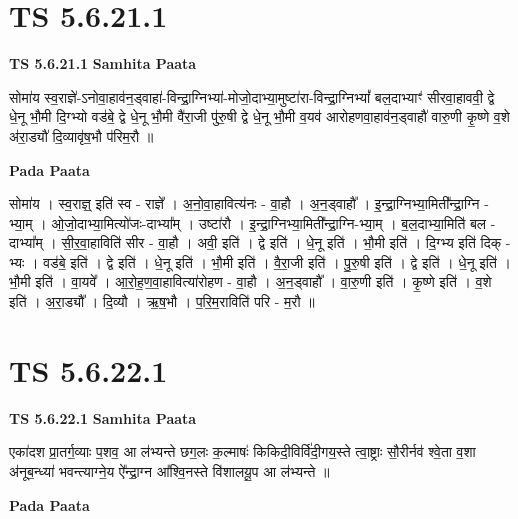 \documentclass[17pt]{extarticle}
\begin{document}

\section{ TS 5.6.21.1 }

\textbf{TS 5.6.21.1 } \newline
\textbf{Samhita Paata} \newline

सोमा॑य स्व॒राज्ञे॑-ऽनोवा॒हाव॑न॒ड्वाहा॑-विन्द्रा॒ग्निभ्या॑-मोजो॒दाभ्या॒मुष्टा॑रा-विन्द्रा॒ग्निभ्यां᳚ बल॒दाभ्याꣳ॑ सीरवा॒हाववी॒ द्वे धे॒नू भौ॒मी दि॒ग्भ्यो वड॑बे॒ द्वे धे॒नू भौ॒मी वै॑रा॒जी पु॑रु॒षी द्वे धे॒नू भौ॒मी व॒यव॑ आरोहणवा॒हाव॑न॒ड्वाहौ॑ वारु॒णी कृ॒ष्णे व॒शे अ॑रा॒ड्यौ॑ दि॒व्यावृ॑ष॒भौ प॑रिम॒रौ ॥ \newline

\textbf{Pada Paata} \newline

सोमा॑य । स्व॒राज्ञ्॒ इति॑ स्व - राज्ञे᳚ । अ॒नो॒वा॒हावित्य॑नः - वा॒हौ । अ॒न॒ड्वाहौ᳚ । इ॒न्द्रा॒ग्निभ्या॒मिती᳚न्द्रा॒ग्नि - भ्या॒म् । ओ॒जो॒दाभ्या॒मित्यो॑जः-दाभ्या᳚म् । उष्टा॑रौ । इ॒न्द्रा॒ग्निभ्या॒मिती᳚न्द्रा॒ग्नि-भ्या॒म् । ब॒ल॒दाभ्या॒मिति॑ बल - दाभ्या᳚म् । सी॒र॒वा॒हाविति॑ सीर - वा॒हौ । अवी॒ इति॑ । द्वे इति॑ । धे॒नू इति॑ । भौ॒मी इति॑ । दि॒ग्भ्य इति॑ दिक् - भ्यः । वड॑बे॒ इति॑ । द्वे इति॑ । धे॒नू इति॑ । भौ॒मी इति॑ । वै॒रा॒जी इति॑ । पु॒रु॒षी इति॑ । द्वे इति॑ । धे॒नू इति॑ । भौ॒मी इति॑ । वा॒यवे᳚ । आ॒रो॒ह॒ण॒वा॒हावित्या॑रोहण - वा॒हौ । अ॒न॒ड्वाहौ᳚ । वा॒रु॒णी इति॑ । कृ॒ष्णे इति॑ । व॒शे इति॑ । अ॒रा॒ड्यौ᳚ । दि॒व्यौ । ऋ॒ष॒भौ । प॒रि॒म॒राविति॑ परि - म॒रौ ॥  \newline





\section{ TS 5.6.22.1 }

\textbf{TS 5.6.22.1 } \newline
\textbf{Samhita Paata} \newline

एका॑दश प्रा॒तर्ग॒व्याः प॒शव॒ आ ल॑भ्यन्ते छग॒लः क॒ल्माषः॑ किकिदी॒विर्वि॑दी॒गय॒स्ते त्वा॒ष्ट्राः सौ॒रीर्नव॑ श्वे॒ता व॒शा अ॑नूब॒न्ध्या॑ भवन्त्याग्ने॒य ऐ᳚न्द्रा॒ग्न आ᳚श्वि॒नस्ते वि॑शालयू॒प आ ल॑भ्यन्ते ॥ \newline

\textbf{Pada Paata} \newline
\end{document}
